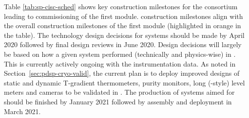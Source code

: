 Table \ref{tab:sp-cisc-sched} shows key construction milestones for the  consortium leading to commissioning of the first  module.  construction milestones align with the overall construction milestones of the first  module (highlighted in orange in the table). The technology design decisions for  systems should be made by April 2020 followed by final design reviews in June 2020. Design decisions will largely be based on how a given system performed (technically and physics-wise) in . This is currently actively ongoing with the  instrumentation data.  
As noted in Section~\ref{sec:pdsp-cryo-valid}, the current plan is to deploy improved designs of static and dynamic T-gradient thermometers, purity monitors, long (\dual-style) level meters and cameras to be validated in . The production of systems aimed for  \single should be finished by January 2021 followed by assembly and deployment in March 2021. 

